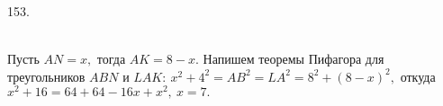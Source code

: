 153. \begin{figure}[ht!]
\end{figure}\\
Пусть $AN=x,$ тогда $AK=8-x.$ Напишем теоремы Пифагора для треугольников $ABN$ и $LAK:\ x^2+4^2=AB^2=LA^2=8^2+(8-x)^2,$ откуда $x^2+16=64+64-16x+x^2,\ x=7.$\\
